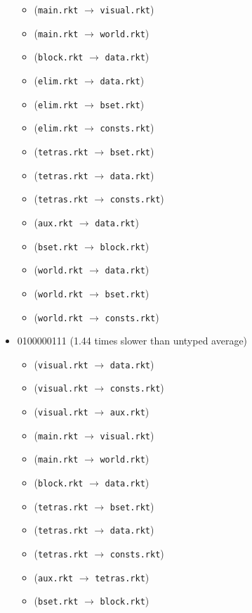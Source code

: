 \documentclass{article}
\newcommand{\mono}[1]{\texttt{#1}}
\begin{document}
\begin{itemize}
\begin{itemize}
  \item (\mono{main.rkt} $\rightarrow$ \mono{visual.rkt})
  \item (\mono{main.rkt} $\rightarrow$ \mono{world.rkt})
  \item (\mono{block.rkt} $\rightarrow$ \mono{data.rkt})
  \item (\mono{elim.rkt} $\rightarrow$ \mono{data.rkt})
  \item (\mono{elim.rkt} $\rightarrow$ \mono{bset.rkt})
  \item (\mono{elim.rkt} $\rightarrow$ \mono{consts.rkt})
  \item (\mono{tetras.rkt} $\rightarrow$ \mono{bset.rkt})
  \item (\mono{tetras.rkt} $\rightarrow$ \mono{data.rkt})
  \item (\mono{tetras.rkt} $\rightarrow$ \mono{consts.rkt})
  \item (\mono{aux.rkt} $\rightarrow$ \mono{data.rkt})
  \item (\mono{bset.rkt} $\rightarrow$ \mono{block.rkt})
  \item (\mono{world.rkt} $\rightarrow$ \mono{data.rkt})
  \item (\mono{world.rkt} $\rightarrow$ \mono{bset.rkt})
  \item (\mono{world.rkt} $\rightarrow$ \mono{consts.rkt})
  \end{itemize}
\item 0100000111 (1.44 times slower than untyped average)
  \begin{itemize}
  \item (\mono{visual.rkt} $\rightarrow$ \mono{data.rkt})
  \item (\mono{visual.rkt} $\rightarrow$ \mono{consts.rkt})
  \item (\mono{visual.rkt} $\rightarrow$ \mono{aux.rkt})
  \item (\mono{main.rkt} $\rightarrow$ \mono{visual.rkt})
  \item (\mono{main.rkt} $\rightarrow$ \mono{world.rkt})
  \item (\mono{block.rkt} $\rightarrow$ \mono{data.rkt})
  \item (\mono{tetras.rkt} $\rightarrow$ \mono{bset.rkt})
  \item (\mono{tetras.rkt} $\rightarrow$ \mono{data.rkt})
  \item (\mono{tetras.rkt} $\rightarrow$ \mono{consts.rkt})
  \item (\mono{aux.rkt} $\rightarrow$ \mono{tetras.rkt})
  \item (\mono{bset.rkt} $\rightarrow$ \mono{block.rkt})

\end{itemize}
\end{itemize}
\end{document}
